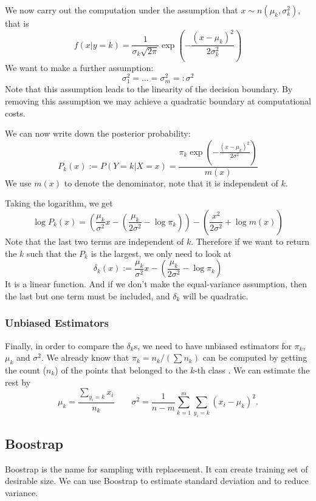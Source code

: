 \documentclass[12pt]{amsart}
\numberwithin{equation}{section}
\theoremstyle{plain}
\theoremstyle{definition}
\begin{document}
We now carry out the computation under the assumption that $x\sim n(\mu_k,\sigma_k^2)$, that is 
$$
f(x|y=k) = \frac{1}{\sigma_k\sqrt{2\pi}}\exp(-\frac{(x-\mu_k)^2}{2\sigma_k^2})
$$
We want to make a further assumption:
$$
\sigma_1^2 = \ldots = \sigma_m^2=:\sigma^2
$$
Note that this assumption leads to the linearity of the decision boundary. By removing this assumption we may achieve a quadratic boundary at computational costs.

We can now write down the posterior probability:
\begin{equation}\label{GDA}
P_k(x) := P(Y=k|X=x) = \frac{\pi_k\exp(-\frac{(x-\mu_k)^2}{2\sigma^2})}{m(x)}
\end{equation}
We use $m(x)$ to denote the denominator, note that it is independent of $k$.

Taking the logarithm, we get
$$
\log P_k(x) = (\frac{\mu_k}{\sigma^2}x-(\frac{\mu_k}{2\sigma^2}-\log\pi_k))-(\frac{x^2}{2\sigma^2}+\log m(x))
$$
Note that the last two terms are independent of $k$. Therefore if we want to return the $k$ such that the $P_k$ is the largest, we only need to look at
$$
\delta_k(x) := \frac{\mu_k}{\sigma^2}x-(\frac{\mu_k}{2\sigma^2}-\log\pi_k)
$$
It is a linear function. And if we don't make the equal-variance assumption, then the last but one term must be included, and $\delta_k$ will be quadratic.
 
\subsubsection{Unbiased Estimators}
Finally, in order to compare the $\delta_k$s, we need to have unbiased estimators for $\pi_k$, $\mu_k$ and $\sigma^2$. We already know that $\pi_k = n_k/(\sum n_k)$ can be computed by getting the count ($n_k$) of the points that belonged to the $k$-th class . We can estimate the rest by 
\begin{equation}\label{GDA_MLE}
\mu_k = \frac{\sum_{y_i = k} x_i}{n_k} \qquad \sigma^2 = \frac{1}{n-m}\sum_{k = 1}^{m}\sum_{y_i = k}(x_i-\mu_k)^2.
\end{equation}


\subsection{Boostrap}

Boostrap is the name for sampling with replacement. It can create training set of desirable size. We can use Boostrap to estimate standard deviation and to reduce variance.
\end{document}
